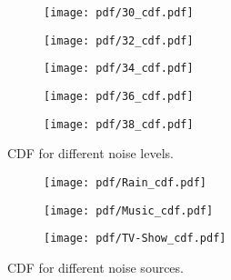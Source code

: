 \begin{figure}[t]
    \centering
    \begin{minipage}{\linewidth}
        \begin{subfigure}{.19\linewidth}
            \texttt{[image: pdf/30\_cdf.pdf]}
            \label{subfig:noise_30}
        \end{subfigure}\hfill
        \begin{subfigure}{.19\linewidth}
            \texttt{[image: pdf/32\_cdf.pdf]}
            \label{subfig:noise_32}
        \end{subfigure}\hfill
        \begin{subfigure}{.19\linewidth}
            \texttt{[image: pdf/34\_cdf.pdf]}
            \label{subfig:noise_34}
        \end{subfigure}\hfill
        \begin{subfigure}{.19\linewidth}
            \texttt{[image: pdf/36\_cdf.pdf]}
            \label{subfig:noise_36}
        \end{subfigure}\hfill
        \begin{subfigure}{.19\linewidth}
            \texttt{[image: pdf/38\_cdf.pdf]}
            \label{subfig:noise_38}
        \end{subfigure}
    \end{minipage}
    \caption{CDF for different noise levels.}
    \label{fig: res_noise1}
\end{figure}

\begin{figure}[t]
    \centering
    \begin{minipage}{\linewidth}
        \begin{subfigure}{.325\linewidth}
            \texttt{[image: pdf/Rain\_cdf.pdf]}
            \label{subfig:noise_rain}
        \end{subfigure}\hfill
        \begin{subfigure}{.325\linewidth}
            \texttt{[image: pdf/Music\_cdf.pdf]}
            \label{subfig:noise_music}
        \end{subfigure}\hfill
        \begin{subfigure}{.34\linewidth}
            \texttt{[image: pdf/TV-Show\_cdf.pdf]}
            \label{subfig:noise_tv}
        \end{subfigure}
    \end{minipage}
    \caption{CDF for different noise sources.}
    \label{fig: res_noise2}
\end{figure}

